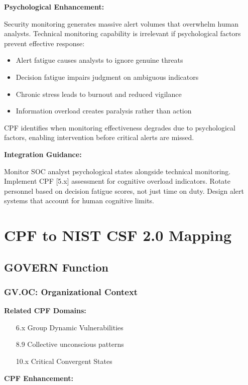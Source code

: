 \documentclass[11pt,a4paper]{article}
\begin{document}
\textbf{Psychological Enhancement:}

Security monitoring generates massive alert volumes that overwhelm human analysts. Technical monitoring capability is irrelevant if psychological factors prevent effective response:

\begin{itemize}
\item Alert fatigue causes analysts to ignore genuine threats
\item Decision fatigue impairs judgment on ambiguous indicators
\item Chronic stress leads to burnout and reduced vigilance
\item Information overload creates paralysis rather than action
\end{itemize}

CPF identifies when monitoring effectiveness degrades due to psychological factors, enabling intervention before critical alerts are missed.

\textbf{Integration Guidance:}

Monitor SOC analyst psychological states alongside technical monitoring. Implement CPF [5.x] assessment for cognitive overload indicators. Rotate personnel based on decision fatigue scores, not just time on duty. Design alert systems that account for human cognitive limits.

\section{CPF to NIST CSF 2.0 Mapping}

\subsection{GOVERN Function}

\subsubsection{GV.OC: Organizational Context}

\textbf{Related CPF Domains:}
\begin{itemize}
\item [6.x] Group Dynamic Vulnerabilities
\item [8.9] Collective unconscious patterns
\item [10.x] Critical Convergent States
\end{itemize}

\textbf{CPF Enhancement:}
\end{document}
